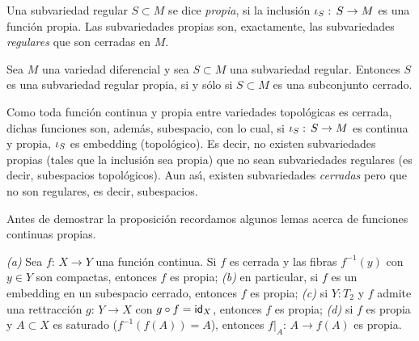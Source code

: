 Una subvariedad regular $S\subset M$ se dice \emph{propia}, si la
inclusi\'{o}n $\inc[S]:\,S\rightarrow M$ es una funci\'{o}n propia. Las
subvariedades propias son, exactamente, las subvariedades \emph{regulares} que
son cerradas en $M$.

\begin{propoRegularCerradaSiiPropia}\label{thm:regularcerradasiipropia}
	Sea $M$ una variedad diferencial y sea $S\subset M$ una
	subvariedad regular. Entonces $S$ es una subvariedad regular
	propia, si y s\'{o}lo si $S\subset M$ es una subconjunto cerrado.
\end{propoRegularCerradaSiiPropia}

Como toda funci\'{o}n continua y propia entre
variedades topol\'{o}gicas es cerrada, dichas funciones son, adem\'{a}s,
subespacio, con lo cual, si $\inc[S]:\,S\rightarrow M$ es continua y
propia, $\inc[S]$ es embedding (topol\'{o}gico). Es decir, no existen
subvariedades propias (tales que la inclusi\'{o}n sea propia) que no sean
subvariedades regulares (es decir, subespacios topol\'{o}gicos). Aun as\'{\i},
existen subvariedades \emph{cerradas} pero que no son regulares, es decir,
subespacios.

Antes de demostrar la proposici\'{o}n recordamos algunos lemas acerca de
funciones continuas propias.

\begin{lemaContinuaPropia}\label{thm:continuapropia}
	\emph{(a)} Sea $f:\,X\rightarrow Y$ una funci\'{o}n continua. Si
	$f$ es cerrada y las fibras $f^{-1}(y)$ con $y\in Y$ son compactas,
	entonces $f$ es propia; \emph{(b)} en particular, si $f$ es un
	embedding en un subespacio cerrado, entonces $f$ es propia;
	\emph{(c)} si $Y:T_{2}$ y $f$ admite una rettracci\'{o}n
	$g:\,Y\rightarrow X$ con $g\circ f=\id[X]$, entonces $f$ es
	propia; \emph{(d)} si $f$ es propia y $A\subset X$ es saturado
	($f^{-1}(f(A))=A$), entonces $f|_{A}:\,A\rightarrow f(A)$ es propia.
\end{lemaContinuaPropia}

